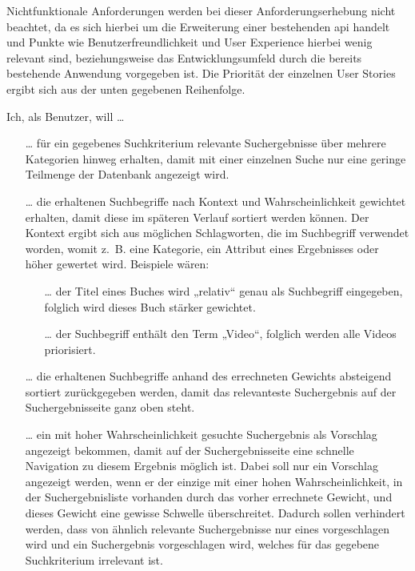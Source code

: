 Nichtfunktionale Anforderungen werden bei dieser Anforderungserhebung nicht beachtet, da es sich hierbei um die Erweiterung einer bestehenden \gls{api} handelt und Punkte wie Benutzerfreundlichkeit und User Experience hierbei wenig relevant sind, beziehungsweise das Entwicklungsumfeld durch die bereits bestehende Anwendung vorgegeben ist.
Die Priorität der einzelnen User Stories ergibt sich aus der unten gegebenen Reihenfolge.

\pagebreak
Ich, als Benutzer, will …
\begin{itemize}
  \item[…] für ein gegebenes Suchkriterium relevante Suchergebnisse über mehrere Kategorien hinweg erhalten, damit mit einer einzelnen Suche nur eine geringe Teilmenge der Datenbank angezeigt wird.
  \item[…] die erhaltenen Suchbegriffe nach Kontext und Wahrscheinlichkeit gewichtet erhalten, damit diese im späteren Verlauf sortiert werden können. Der Kontext ergibt sich aus möglichen Schlagworten, die im Suchbegriff verwendet worden, womit z. B. eine Kategorie, ein Attribut eines Ergebnisses oder höher gewertet wird. Beispiele wären:
    \begin{itemize}
      \item[…] der Titel eines Buches wird „relativ“ genau als Suchbegriff eingegeben, folglich wird dieses Buch stärker gewichtet.
      \item[…] der Suchbegriff enthält den Term „Video“, folglich werden alle Videos priorisiert.
    \end{itemize}
  \item[…] die erhaltenen Suchbegriffe anhand des errechneten Gewichts absteigend sortiert zurückgegeben werden, damit das relevanteste Suchergebnis auf der Suchergebnisseite ganz oben steht.
  \item[…] ein mit hoher Wahrscheinlichkeit gesuchte Suchergebnis als Vorschlag angezeigt bekommen, damit auf der Suchergebnisseite eine schnelle Navigation zu diesem Ergebnis möglich ist.
    Dabei soll nur ein Vorschlag angezeigt werden, wenn er der einzige mit einer hohen Wahrscheinlichkeit, in der Suchergebnisliste vorhanden durch das vorher errechnete Gewicht, und dieses Gewicht eine gewisse Schwelle überschreitet.
    Dadurch sollen verhindert werden, dass von ähnlich relevante Suchergebnisse nur eines vorgeschlagen wird und ein Suchergebnis vorgeschlagen wird, welches für das gegebene Suchkriterium irrelevant ist.
\end{itemize}
